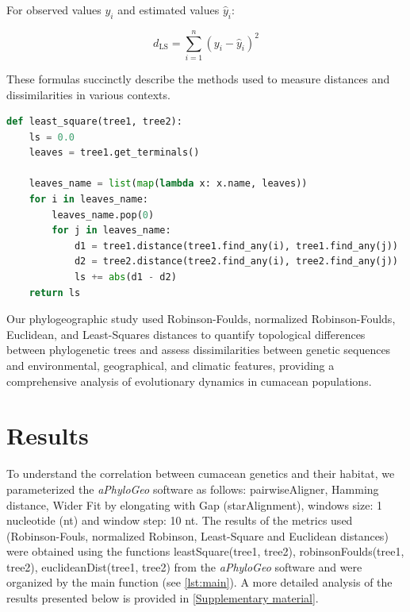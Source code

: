 For observed values $y_i$ and estimated values $\hat{y}_i$:

\begin{equation}\label{eq:ls}
    d_{\text{LS}} = \sum_{i=1}^{n} (y_i - \hat{y}_i)^2
\end{equation}

These formulas succinctly describe the methods used to measure distances and dissimilarities in various contexts.

\begin{lstlisting}[label=lst:LeastSquare, language=Python, caption=Python script for calculating the Least-Square distance using the ete3 package in the aPhyloGeo package]
def least_square(tree1, tree2):
    ls = 0.0
    leaves = tree1.get_terminals()

    leaves_name = list(map(lambda x: x.name, leaves))
    for i in leaves_name:
        leaves_name.pop(0)
        for j in leaves_name:
            d1 = tree1.distance(tree1.find_any(i), tree1.find_any(j))
            d2 = tree2.distance(tree2.find_any(i), tree2.find_any(j))
            ls += abs(d1 - d2)
    return ls
\end{lstlisting}

Our phylogeographic study used Robinson-Foulds, normalized Robinson-Foulds, Euclidean, and Least-Squares distances to quantify topological differences between phylogenetic trees and assess dissimilarities between genetic sequences and environmental, geographical, and climatic features, providing a comprehensive analysis of evolutionary dynamics in cumacean populations.

\section{Results}\label{results}

To understand the correlation between cumacean genetics and their habitat, we parameterized the \textit{aPhyloGeo} software as follows: pairwiseAligner, Hamming distance, Wider Fit by elongating with Gap (starAlignment), windows size: 1 nucleotide (nt) and window step: 10 nt. The results of the metrics used (Robinson-Fouls, normalized Robinson, Least-Square and Euclidean distances) were obtained using the functions leastSquare(tree1, tree2), robinsonFoulds(tree1, tree2), euclideanDist(tree1, tree2) from the \textit{aPhyloGeo} software and were organized by the main function (see \autoref{lst:main}). A more detailed analysis of the results presented below is provided in \ref{Supplementary material}.

